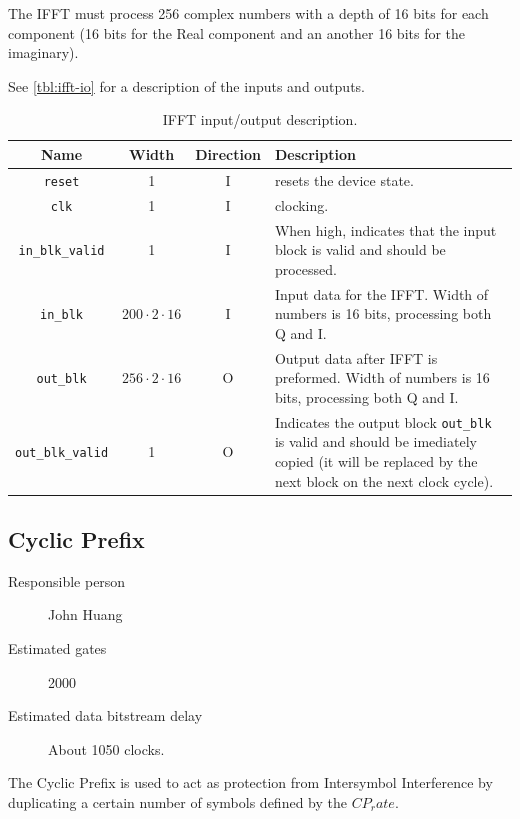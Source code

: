 \documentclass[dvips,10pt,twocolumn]{article}
\newcommand{\wire}{\texttt}
\begin{document}
The IFFT must process 256 complex numbers with a depth of 16 bits for each
component (16 bits for the Real component and an another 16 bits for the
imaginary).

See \autoref{tbl:ifft-io} for a description of the inputs and outputs.

\begin{table} \begin{tabularx}{\linewidth}{c|c|c|X}
	\label{tbl:ifft-io}
	
	Name & Width & Direction & Description \\ \hline

	\wire{reset} & 1 & I & resets the device state. \\

	\wire{clk}   & 1 & I & clocking. \\

	\wire{in\_blk\_valid} & 1 & I & When high, indicates that the input block is
	valid and should be processed. \\

	\wire{in\_blk} & $200 \cdot 2 \cdot 16$ & I & Input data for the IFFT. Width of
	numbers is 16 bits, processing both Q and I. \\

	\wire{out\_blk} & $256 \cdot 2 \cdot 16$ & O & Output data after IFFT is preformed. Width of
	numbers is 16 bits, processing both Q and I. \\

	\wire{out\_blk\_valid} & 1 & O & Indicates the output block
	\wire{out\_blk} is valid and should be imediately copied (it will be
	replaced by the next block on the next clock cycle).

\end{tabularx}
\caption{IFFT input/output description.}
\end{table}


	\subsection{Cyclic Prefix}
	\label{sec:cyclic_prefix}
	\begin{description}
		\item[Responsible person] John Huang
		\item[Estimated gates] 2000
		\item[Estimated data bitstream delay] About 1050 clocks.
	\end{description}
	
	The Cyclic Prefix is used to act as protection from Intersymbol Interference 
	by duplicating a certain number of symbols defined by the $CP_rate$.
	
\end{document}
